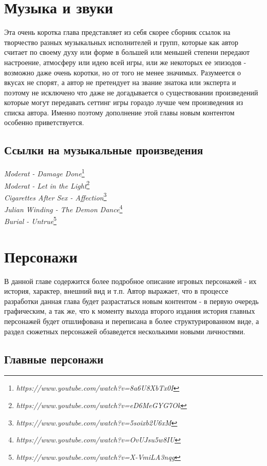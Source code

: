 \documentclass[11pt]{report}
\begin{document}
\chapter{Музыка и звуки}
Эта очень коротка глава представляет из себя скорее сборник ссылок на творчество разных музыкальных исполнителей и групп, которые как автор считает по своему духу или форме в большей или меньшей степени передают настроение, атмосферу или идею всей игры, или же некоторых ее эпизодов - возможно даже очень коротки, но от того не менее значимых. Разумеется о вкусах не спорят, а автор не претендует на звание знатока или эксперта и поэтому не исключено что даже не догадывается о существовании произведений которые могут
передавать сеттинг игры гораздо лучше чем произведения из списка автора. Именно поэтому дополнение этой главы новым контентом особенно приветствуется.
\newpage

\section{Ссылки на музыкальные произведения}

\textit{Moderat - Damage Done}\footnote{\emph{https://www.youtube.com/watch?v=8a6U8XbTx0I}}
\\
\textit{Moderat - Let in the Light}\footnote{\emph{https://www.youtube.com/watch?v=eD6MeGYG7Ok}}
\\
\textit{Cigarettes After Sex - Affection}\footnote{\emph{https://www.youtube.com/watch?v=5soixb2U6xM}}
\\
\textit{Julian Winding - The Demon Dance}\footnote{\emph{https://www.youtube.com/watch?v=OvUJsu5w8IU}}
\\
\textit{Burial - Untrue}\footnote{\emph{https://www.youtube.com/watch?v=X-VmiLA3nqg}}
 

\chapter{Персонажи}
В данной главе содержится более подробное описание игровых персонажей - их история, характер, внешний вид и т.п. Автор выражает, что в процессе разработки данная глава будет разрастаться новым контентом - в первую очередь графическим, а так же,  что к моменту выхода второго издания история главных персонажей будет отшлифована и переписана в более структурированном виде, а раздел сюжетных персонажей обзаведется несколькими новыми личностями.

\newpage
\section{Главные персонажи}
\end{document}
